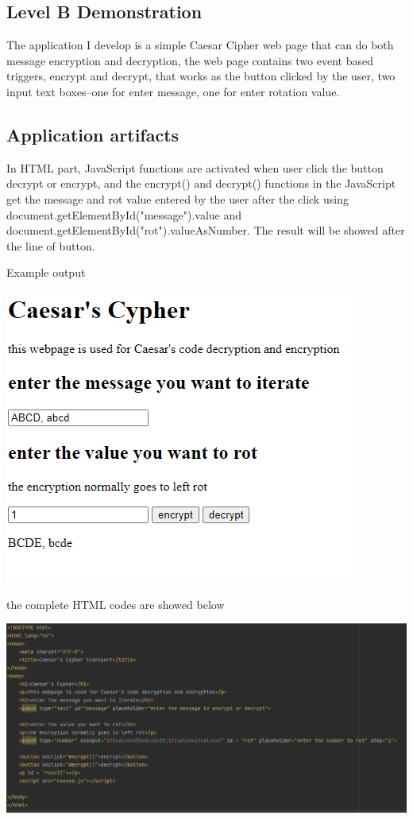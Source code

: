 \documentclass[a4paper, 11pt]{report}
\begin{document}
\subsection{Level B Demonstration}
The application I develop is a simple Caesar Cipher web page that can do both message encryption and decryption, the web page contains two event based triggers, encrypt and decrypt, that works as the button clicked by the user, two input text boxes--one for enter message, one for enter rotation value.

\subsection{Application artifacts}

In HTML part, JavaScript functions are activated when user click the button decrypt or encrypt, and the encrypt()
and decrypt() functions in the JavaScript get the message and rot value entered by the user after the click using 
document.getElementById("message").value and document.getElementById("rot").valueAsNumber. The result will be 
showed after the line of button.

Example output

\includegraphics{screengrabs/result for encryption.png}

the complete HTML codes are showed below

\includegraphics[width=14cm]{screengrabs/HTML code.png}
\end{document}
